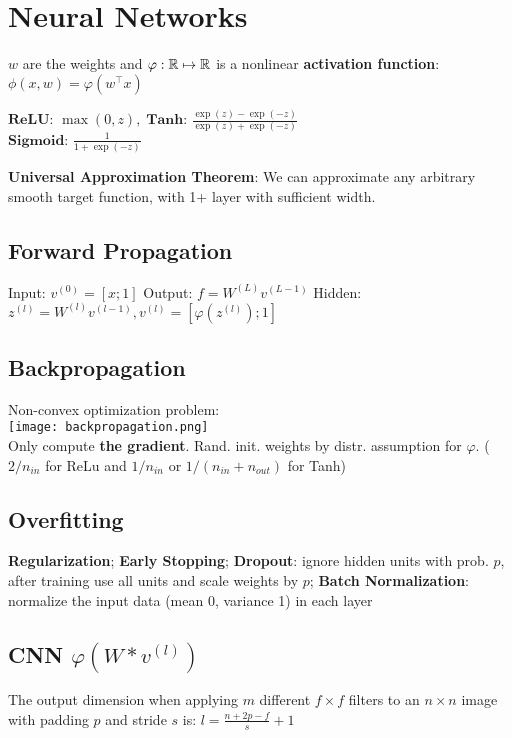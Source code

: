 \section*{Neural Networks}
$w$ are the weights and $\varphi: \mathbb{R} \mapsto \mathbb{R}$ is a nonlinear \textbf{activation function}: $\phi(x, w) = \varphi(w^\top x)$


$\textbf{ReLU: } \max (0,z), \; \textbf{Tanh: } \frac{\exp(z) - \exp(-z)}{\exp(z) + \exp(-z)}$ \\[-3pt]
$\textbf{Sigmoid: } \frac{1}{1 + \exp(-z)}$


\textbf{Universal Approximation Theorem}: We can approximate any arbitrary smooth target function, with 1+ layer with sufficient width.

\subsection*{Forward Propagation}

Input: $v^{(0)} = [x; 1]$ \quad Output: $f = W^{(L)} v^{(L-1)}$
Hidden: $z^{(l)} = W^{(l)} v^{(l-1)}, v^{(l)} = [\varphi(z^{(l)}); 1]$


\subsection*{Backpropagation}

Non-convex optimization problem: \\[-10pt]

\texttt{[image: backpropagation.png]} \\[-15pt]

Only compute \color{Red} \textbf{the gradient}\color{Black}. Rand. init. weights by distr. assumption for $\varphi$. ( $2 / n_{in}$ for ReLu and $1/n_{in}$ or $ 1/ (n_{in} + n_{out})$ for Tanh)

\subsection*{Overfitting}
\textbf{Regularization}; \textbf{Early Stopping}; \textbf{Dropout}: ignore hidden units with prob. $p$, after training use all units and scale weights by $p$; \textbf{Batch Normalization}: normalize the input data (mean 0, variance 1) in each layer

\subsection*{CNN \quad \color{Black}$\varphi(W * v^{(l)})$}

The output dimension when applying $m$ different $f \times f$ filters to an $n \times n$ image with padding $p$ and stride $s$ is:
$l = \frac{n + 2p - f}{s} + 1$
